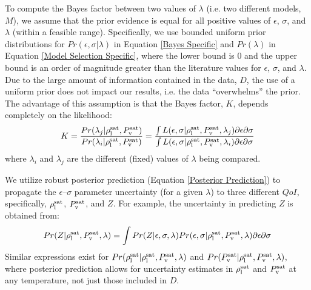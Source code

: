 \documentclass[preprint,letterpaper,floatfix,citeautoscript,aip,jcp]{revtex4-1}
\begin{document}
To compute the Bayes factor between two values of $\lambda$ 
(i.e. two different models, $M$), we assume that the prior evidence is equal for all positive values of $\epsilon$, $\sigma$, and $\lambda$ (within a feasible range). Specifically, we use bounded uniform prior distributions for $Pr(\epsilon,\sigma|\lambda)$ in Equation \ref{Bayes Specific} and $Pr(\lambda)$ in Equation \ref{Model Selection Specific}, where the lower bound is 0 and the upper bound is an order of magnitude greater than the literature values for $\epsilon$, $\sigma$, and $\lambda$. Due to the large amount of information contained in the data, $D$, the use of a uniform prior does not impact our results, i.e. the data ``overwhelms'' the prior.
The advantage of this assumption is that the Bayes factor, $K$, depends completely on the likelihood:
\begin{equation} \label{Bayes Factor}
K = \frac{Pr(\lambda_j|\rho_{\rm l}^{\rm sat},P_{\rm v}^{\rm sat})}{Pr(\lambda_i|\rho_{\rm l}^{\rm sat},P_{\rm v}^{\rm sat})} = \frac{ \int L(\epsilon,\sigma|\rho_{\rm l}^{\rm sat},P_{\rm v}^{\rm sat},\lambda_j) \partial\epsilon \partial\sigma}{ \int L(\epsilon,\sigma|\rho_{\rm l}^{\rm sat},P_{\rm v}^{\rm sat},\lambda_i) \partial\epsilon \partial\sigma}
\end{equation}
where $\lambda_i$ and $\lambda_j$ are the different (fixed) values of $\lambda$ being compared.

We utilize robust posterior prediction (Equation \ref{Posterior Prediction}) to propagate the $\epsilon$--$\sigma$ parameter uncertainty (for a given $\lambda$) to three different $QoI$, specifically, $\rho_{\rm l}^{\rm sat}$, $P_{\rm v}^{\rm sat}$, and $Z$. For example, the uncertainty in predicting $Z$ 
is obtained from:
\begin{equation} \label{Posterior Prediction Z}
Pr(Z|\rho_{\rm l}^{\rm sat},P_{\rm v}^{\rm sat},\lambda) = \int Pr(Z|\epsilon,\sigma,\lambda) Pr(\epsilon, \sigma|\rho_{\rm l}^{\rm sat},P_{\rm v}^{\rm sat},\lambda) \partial\epsilon \partial\sigma
\end{equation}
Similar expressions exist for $Pr(\rho_{\rm l}^{\rm sat}|\rho_{\rm l}^{\rm sat},P_{\rm v}^{\rm sat},\lambda)$ and $Pr(P_{\rm v}^{\rm sat}|\rho_{\rm l}^{\rm sat},P_{\rm v}^{\rm sat},\lambda)$, where posterior prediction allows for uncertainty estimates in $\rho_{\rm l}^{\rm sat}$ and $P_{\rm v}^{\rm sat}$ at any temperature, not just those included in $D$. 
\end{document}
